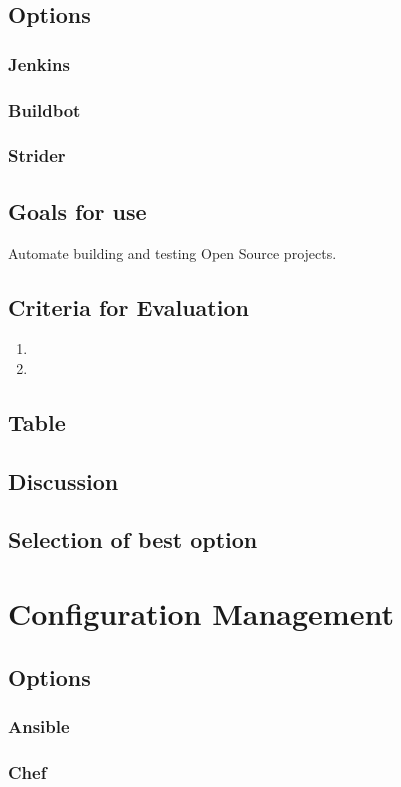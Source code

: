 \documentclass[10pt,letterpaper,onecolumn,journal]{IEEEtran}
\begin{document}
\subsection{Options}
\subsubsection{Jenkins}
\subsubsection{Buildbot}
\subsubsection{Strider}
\subsection{Goals for use}
Automate building and testing Open Source projects.
\subsection{Criteria for Evaluation}
\begin{enumerate}
  \item
  \item
\end{enumerate}
\subsection{Table}
\subsection{Discussion}
\subsection{Selection of best option}

\section{Configuration Management}
\subsection{Options}
\subsubsection{Ansible}
\subsubsection{Chef}
\end{document}
